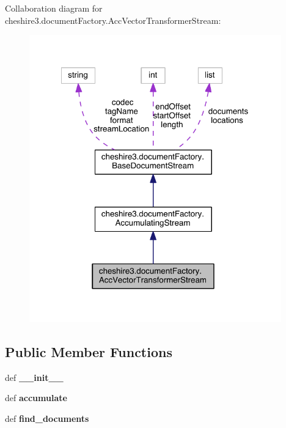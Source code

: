Collaboration diagram for cheshire3.\-document\-Factory.\-Acc\-Vector\-Transformer\-Stream\-:
\nopagebreak
\begin{figure}[H]
\begin{center}
\leavevmode
\includegraphics[width=309pt]{classcheshire3_1_1document_factory_1_1_acc_vector_transformer_stream__coll__graph}
\end{center}
\end{figure}
\subsection*{Public Member Functions}
\begin{DoxyCompactItemize}
\item 
\hypertarget{classcheshire3_1_1document_factory_1_1_acc_vector_transformer_stream_aacf6abc7a814d22f65c07ed112000946}{def {\bfseries \-\_\-\-\_\-init\-\_\-\-\_\-}}\label{classcheshire3_1_1document_factory_1_1_acc_vector_transformer_stream_aacf6abc7a814d22f65c07ed112000946}

\item 
\hypertarget{classcheshire3_1_1document_factory_1_1_acc_vector_transformer_stream_a0a141448e38d829ec57a56ea0ea08a8a}{def {\bfseries accumulate}}\label{classcheshire3_1_1document_factory_1_1_acc_vector_transformer_stream_a0a141448e38d829ec57a56ea0ea08a8a}

\item 
\hypertarget{classcheshire3_1_1document_factory_1_1_acc_vector_transformer_stream_a5cf55230c63818213be375060665404c}{def {\bfseries find\-\_\-documents}}\label{classcheshire3_1_1document_factory_1_1_acc_vector_transformer_stream_a5cf55230c63818213be375060665404c}

\end{DoxyCompactItemize}
